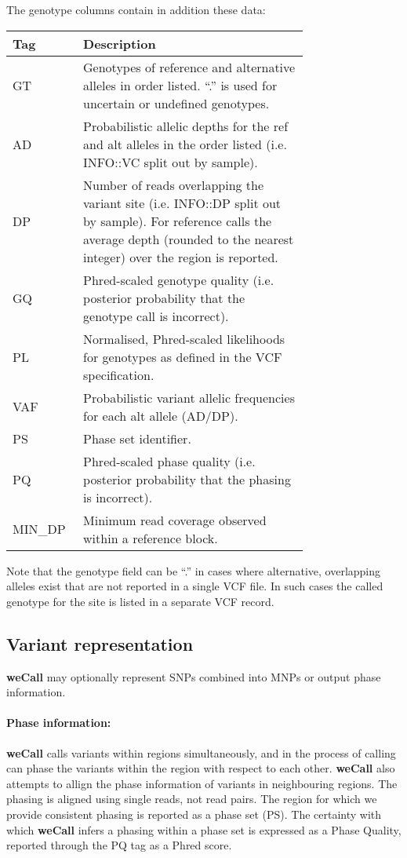 \documentclass{article}
\newcommand{\wecallproduct}{\textbf{weCall}}
\begin{document}
The genotype columns contain in addition these data:
\begin{center}
\renewcommand{\arraystretch}{1.3}
\begin{tabular}{p{0.1\linewidth}p{0.65\linewidth}}
  Tag & Description \\ \hline
  GT & Genotypes of reference and alternative alleles in order listed. ``.'' is used for uncertain or undefined genotypes. \\
  AD & Probabilistic allelic depths for the ref and alt alleles in the order listed (i.e. INFO::VC split out by sample). \\
  DP & Number of reads overlapping the variant site (i.e. INFO::DP split out by sample). For reference calls the average depth (rounded to the nearest integer) over the region is reported. \\
  GQ & Phred-scaled genotype quality (i.e. posterior probability that the genotype call is incorrect). \\
  PL & Normalised, Phred-scaled likelihoods for genotypes as defined in the VCF specification. \\
  VAF & Probabilistic variant allelic frequencies for each alt allele (AD/DP). \\
  PS & Phase set identifier. \\
  PQ & Phred-scaled phase quality (i.e. posterior probability that the phasing is incorrect). \\ 
  MIN\_DP & Minimum read coverage observed within a reference block. \\ \hline
\end{tabular}
\end{center}


Note that the genotype field can be ``.'' in cases where alternative, overlapping alleles exist that are not
reported in a single VCF file. In such cases the called genotype for the site is listed in a separate VCF record.
  
\subsection{Variant representation}
\textbf{{\wecallproduct}} may optionally represent SNPs combined into MNPs or output phase information.

\paragraph{Phase information:}

\textbf{{\wecallproduct}} calls variants within regions simultaneously, and in the process of calling can phase the variants within the region with respect to each other. \textbf{{\wecallproduct}} also attempts to allign the phase information of variants in neighbouring regions. The phasing is aligned using single reads, not read pairs. The region for which we provide consistent phasing is reported as a phase set (PS). The certainty with which \textbf{{\wecallproduct}} infers a phasing within a phase set is expressed as a Phase Quality, reported through the PQ tag as a Phred score.
\end{document}
